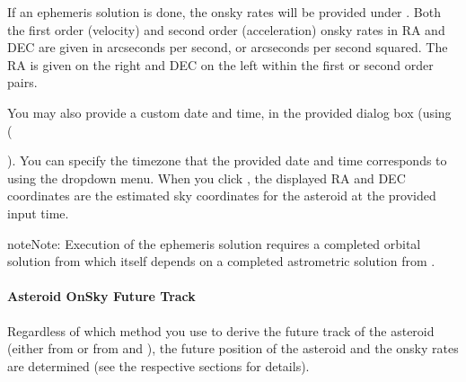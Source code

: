\documentclass[letterpaper,11pt,english]{sphinxmanual}
\begin{document}
\sphinxAtStartPar
If an ephemeris solution is done, the on\sphinxhyphen{}sky rates will be provided under
. Both the first order (velocity) and
second order (acceleration) on\sphinxhyphen{}sky rates in RA and DEC are given in arcseconds
per second, or arcseconds per second squared. The RA is given on the right and
DEC on the left within the first or second order pairs.

\sphinxAtStartPar
You may also provide a custom date and time, in the provided dialog box (using
(%
\begin{footnote}[8]\sphinxAtStartFootnote
{}
%
\end{footnote}). You
can specify the timezone that the provided date and time corresponds to using
the dropdown menu. When you click , the displayed RA
and DEC coordinates are the estimated sky coordinates for the asteroid at the
provided input time.

\begin{sphinxadmonition}{note}{Note:}
\sphinxAtStartPar
Execution of the ephemeris solution requires a completed orbital
solution from {\hyperref[\detokenize{user/manual_mode:user-manual-mode-procedure-orbital-elements}]{}} which
itself depends on a completed astrometric solution from
{\hyperref[\detokenize{user/manual_mode:user-manual-mode-procedure-find-asteroid-location-compute-astrometric-solution}]{}}.
\end{sphinxadmonition}


\paragraph{Asteroid On\sphinxhyphen{}Sky Future Track}
\label{\detokenize{user/manual_mode:asteroid-on-sky-future-track}}\label{\detokenize{user/manual_mode:user-manual-procedure-asteroid-on-sky-future-track}}
\sphinxAtStartPar
Regardless of which method you use to derive the future track of the asteroid
(either from {\hyperref[\detokenize{user/manual_mode:user-manual-mode-procedure-asteroid-position-propagation}]{}} or
from {\hyperref[\detokenize{user/manual_mode:user-manual-mode-procedure-orbital-elements}]{}} and
{\hyperref[\detokenize{user/manual_mode:user-manual-mode-procedure-ephemeris}]{}}), the future position of the
asteroid and the on\sphinxhyphen{}sky rates are determined (see the respective sections
for details).
\end{document}
